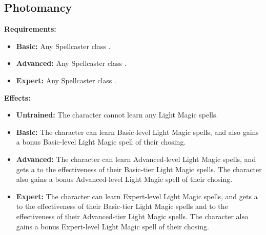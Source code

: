 \documentclass[openany,10pt,a4paper]{book}
\begin{document}
\subsection{Photomancy}
\begin{table}[!ht]
\centering
{}
\end{table}
\textbf{Requirements:}
\begin{itemize}
	\item \textbf{Basic:} Any Spellcaster class .
	\item \textbf{Advanced:} Any Spellcaster class .
	\item \textbf{Expert:} Any Spellcaster class .
\end{itemize}
\textbf{Effects:}
\begin{itemize}
	\item \textbf{Untrained:} The character cannot learn any Light Magic spells.
	\item \textbf{Basic:} The character can learn Basic-level Light Magic spells, and also gains a bonus Basic-level Light Magic spell of their chosing.
	\item \textbf{Advanced:} The character can learn Advanced-level Light Magic spells, and gets a  to the effectiveness of their Basic-tier Light Magic spells. The character also gains a bonus Advanced-level Light Magic spell of their chosing.
	\item \textbf{Expert:} The character can learn Expert-level Light Magic spells, and gets a  to the effectiveness of their Basic-tier Light Magic spells and  to the effectiveness of their Advanced-tier Light Magic spells. The character also gains a bonus Expert-level Light Magic spell of their chosing.
\end{itemize}\newpage
\end{document}

